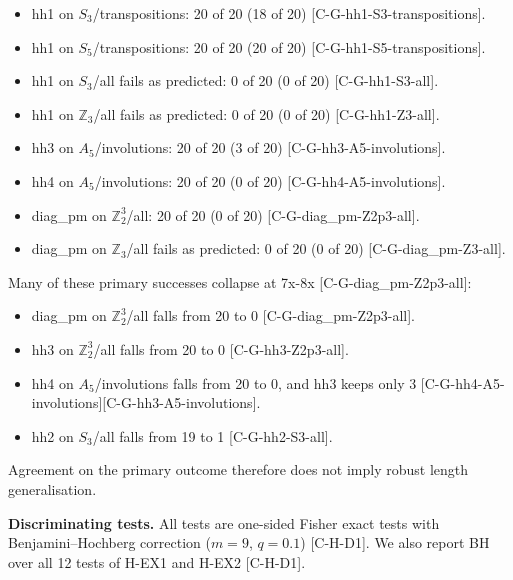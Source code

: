 \documentclass[10pt,twocolumn,a4paper]{article}
\providecommand{\tightlist}{\setlength{\itemsep}{0pt}\setlength{\parskip}{0pt}}
\begin{document}
\begin{itemize}
\tightlist
\item
  hh1 on \(S_3\)/transpositions: 20 of 20 (18 of 20) {[}C-G-hh1-S3-transpositions{]}.
\item
  hh1 on \(S_5\)/transpositions: 20 of 20 (20 of 20) {[}C-G-hh1-S5-transpositions{]}.
\item
  hh1 on \(S_3\)/all fails as predicted: 0 of 20 (0 of 20) {[}C-G-hh1-S3-all{]}.
\item
  hh1 on \(\mathbb{Z}_3\)/all fails as predicted: 0 of 20 (0 of 20) {[}C-G-hh1-Z3-all{]}.
\item
  hh3 on \(A_5\)/involutions: 20 of 20 (3 of 20) {[}C-G-hh3-A5-involutions{]}.
\item
  hh4 on \(A_5\)/involutions: 20 of 20 (0 of 20) {[}C-G-hh4-A5-involutions{]}.
\item
  diag\_pm on \(\mathbb{Z}_2^3\)/all: 20 of 20 (0 of 20) {[}C-G-diag\_pm-Z2p3-all{]}.
\item
  diag\_pm on \(\mathbb{Z}_3\)/all fails as predicted: 0 of 20 (0 of 20) {[}C-G-diag\_pm-Z3-all{]}.
\end{itemize}

Many of these primary successes collapse at 7x-8x {[}C-G-diag\_pm-Z2p3-all{]}:

\begin{itemize}
\tightlist
\item
  diag\_pm on \(\mathbb{Z}_2^3\)/all falls from 20 to 0 {[}C-G-diag\_pm-Z2p3-all{]}.
\item
  hh3 on \(\mathbb{Z}_2^3\)/all falls from 20 to 0 {[}C-G-hh3-Z2p3-all{]}.
\item
  hh4 on \(A_5\)/involutions falls from 20 to 0, and hh3 keeps only 3 {[}C-G-hh4-A5-involutions{]}{[}C-G-hh3-A5-involutions{]}.
\item
  hh2 on \(S_3\)/all falls from 19 to 1 {[}C-G-hh2-S3-all{]}.
\end{itemize}

Agreement on the primary outcome therefore does not imply robust length generalisation.

\textbf{Discriminating tests.} All tests are one-sided Fisher exact tests with Benjamini--Hochberg correction (\(m = 9\), \(q = 0.1\)) {[}C-H-D1{]}. We also report BH over all 12 tests of H-EX1 and H-EX2 {[}C-H-D1{]}.
\end{document}
